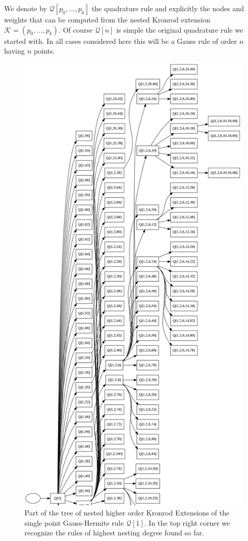 \documentclass[a4paper,10pt]{article}
\begin{document}
We denote by $\mathcal{Q}[p_0, \ldots, p_k]$ the quadrature rule and explicitly
the nodes and weights that can be computed from the nested Kronrod extension
$\mathcal{K} = (p_0, \ldots, p_k)$. Of course $\mathcal{Q}[n]$ is simple the
original quadrature rule we started with. In all cases considered here this
will be a Gauss rule of order $n$ having $n$ points.

\begin{figure}
  \centering
  \includegraphics[width=0.8\linewidth]{./img/graph_hermite_1_100_6_part.png}
  \caption{Part of the tree of nested higher order Kronrod Extensions of the
  single point Gauss-Hermite rule $\mathcal{Q}[1]$. In the top right corner
  we recognize the rules of highest nesting degree found so far.}
  \label{fig:graph_1_100_6_part}
\end{figure}
\end{document}
